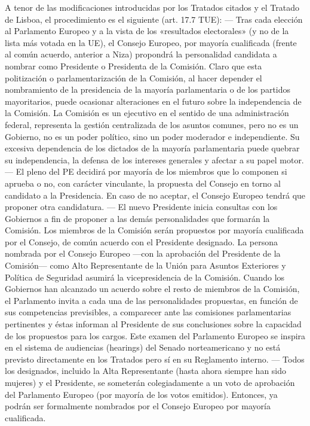 \documentclass[10pt,a4paper]{article}
\begin{document}
A tenor de las modificaciones introducidas por los Tratados citados y el Tratado de Lisboa, el procedimiento es el siguiente (art. 17.7 TUE):
— Tras cada elección al Parlamento Europeo y a la vista de los «resultados electorales» (y no de la lista más votada en la UE), el Consejo Europeo, por mayoría cualificada (frente al común acuerdo, anterior a Niza) propondrá la personalidad candidata a nombrar como Presidente o Presidenta de la Comisión. Claro que esta politización o parlamentarización de la Comisión, al hacer depender el nombramiento de la presidencia de la mayoría parlamentaria o de los partidos mayoritarios, puede ocasionar alteraciones en el futuro sobre la independencia de la Comisión. La Comisión es un ejecutivo en el sentido de una administración federal, representa la gestión centralizada de los asuntos comunes, pero no es un Gobierno, no es un poder político, sino un poder moderador e independiente. Su excesiva dependencia de los dictados de la mayoría parlamentaria puede quebrar su independencia, la defensa de los intereses generales y afectar a su papel motor.
— El pleno del PE decidirá por mayoría de los miembros que lo componen si aprueba o no, con carácter vinculante, la propuesta del Consejo en torno al candidato a la Presidencia. En caso de no aceptar, el Consejo Europeo tendrá que proponer otra candidatura. 
— El nuevo Presidente inicia consultas con los Gobiernos a fin de proponer a las demás personalidades que formarán la Comisión. Los miembros de la Comisión serán propuestos por mayoría cualificada por el Consejo, de común acuerdo con el Presidente designado. La persona nombrada por el Consejo Europeo —con la  aprobación del Presidente de la Comisión— como Alto Representante de la Unión para Asuntos Exteriores y Política de Seguridad asumirá la vicepresidencia de la Comisión. Cuando los Gobiernos han alcanzado un acuerdo sobre el resto de miembros de la Comisión, el Parlamento invita a cada una de las personalidades propuestas, en función de sus competencias previsibles, a comparecer ante las comisiones parlamentarias pertinentes y éstas informan al Presidente de sus conclusiones sobre la capacidad de los propuestos para los cargos. Este examen del Parlamento Europeo se inspira en el sistema de audiencias (hearings) del Senado norteamericano y no está previsto directamente en los Tratados pero sí en su Reglamento interno.
— Todos los designados, incluido la Alta Representante (hasta ahora siempre han sido mujeres) y el Presidente, se someterán colegiadamente a un voto de aprobación del Parlamento Europeo (por mayoría de los votos emitidos). Entonces, ya podrán ser formalmente nombrados por el Consejo Europeo por mayoría cualificada.
\end{document}
